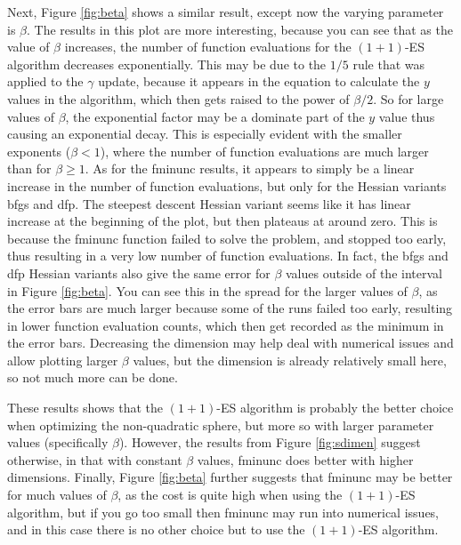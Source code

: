 \documentclass[sigconf, 7pt]{acmart}
\begin{document}
Next, Figure \ref{fig:beta} shows a similar result, except now the varying parameter is $\beta$. The results in this plot are more interesting, because you can see that as the value of $\beta$ increases, the number of function evaluations for the $(1+1)$-ES algorithm decreases exponentially. This may be due to the $1/5$ rule that was applied to the $\gamma$ update, because it appears in the equation to calculate the $y$ values in the algorithm, which then gets raised to the power of $\beta/2$. So for large values of $\beta$, the exponential factor may be a dominate part of the $y$ value thus causing an exponential decay. This is especially evident with the smaller exponents ($\beta < 1$), where the number of function evaluations are much larger than for $\beta \geq 1$. As for the fminunc results, it appears to simply be a linear increase in the number of function evaluations, but only for the Hessian variants bfgs and dfp. The steepest descent Hessian variant seems like it has linear increase at the beginning of the plot, but then plateaus at around zero. This is because the fminunc function failed to solve the problem, and stopped too early, thus resulting in a very low number of function evaluations. In fact, the bfgs and dfp Hessian variants also give the same error for $\beta$ values outside of the interval in Figure \ref{fig:beta}. You can see this in the spread for the larger values of $\beta$, as the error bars are much larger because some of the runs failed too early, resulting in lower function evaluation counts, which then get recorded as the minimum in the error bars. Decreasing the dimension may help deal with numerical issues and allow plotting larger $\beta$ values, but the dimension is already relatively small here, so not much more can be done.

These results shows that the $(1+1)$-ES algorithm is probably the better choice when optimizing the non-quadratic sphere, but more so with larger parameter values (specifically $\beta$). However, the results from Figure \ref{fig:sdimen} suggest otherwise, in that with constant $\beta$ values, fminunc does better with higher dimensions. Finally, Figure \ref{fig:beta} further suggests that fminunc may be better for much values of $\beta$, as the cost is quite high when using the $(1+1)$-ES algorithm, but if you go too small then fminunc may run into numerical issues, and in this case there is no other choice but to use the $(1+1)$-ES algorithm.
\end{document}
